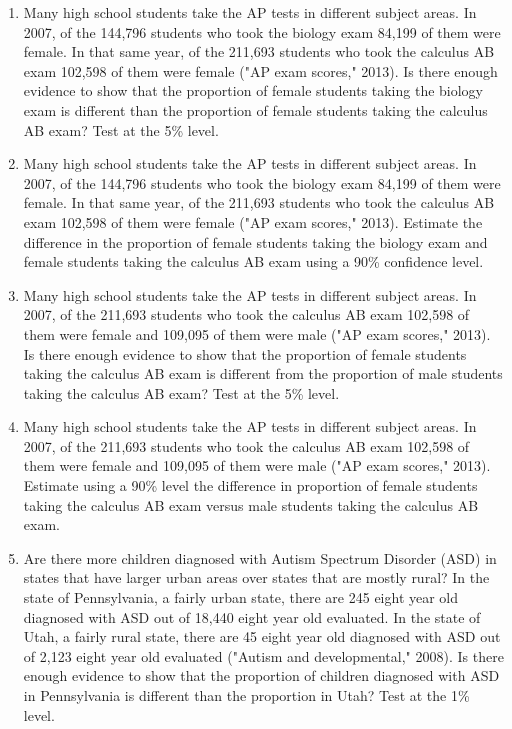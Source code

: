 \documentclass[
]{book}
\begin{document}
\begin{enumerate}
\def\labelenumi{\arabic{enumi}.}
\item
  Many high school students take the AP tests in different subject areas. In 2007, of the 144,796 students who took the biology exam 84,199 of them were female. In that same year, of the 211,693 students who took the calculus AB exam 102,598 of them were female ("AP exam scores," 2013). Is there enough evidence to show that the proportion of female students taking the biology exam is different than the proportion of female students taking the calculus AB exam? Test at the 5\% level.
\item
  Many high school students take the AP tests in different subject areas. In 2007, of the 144,796 students who took the biology exam 84,199 of them were female. In that same year, of the 211,693 students who took the calculus AB exam 102,598 of them were female ("AP exam scores," 2013). Estimate the difference in the proportion of female students taking the biology exam and female students taking the calculus AB exam using a 90\% confidence level.
\item
  Many high school students take the AP tests in different subject areas. In 2007, of the 211,693 students who took the calculus AB exam 102,598 of them were female and 109,095 of them were male ("AP exam scores," 2013). Is there enough evidence to show that the proportion of female students taking the calculus AB exam is different from the proportion of male students taking the calculus AB exam? Test at the 5\% level.
\item
  Many high school students take the AP tests in different subject areas. In 2007, of the 211,693 students who took the calculus AB exam 102,598 of them were female and 109,095 of them were male ("AP exam scores," 2013). Estimate using a 90\% level the difference in proportion of female students taking the calculus AB exam versus male students taking the calculus AB exam.
\item
  Are there more children diagnosed with Autism Spectrum Disorder (ASD) in states that have larger urban areas over states that are mostly rural? In the state of Pennsylvania, a fairly urban state, there are 245 eight year old diagnosed with ASD out of 18,440 eight year old evaluated. In the state of Utah, a fairly rural state, there are 45 eight year old diagnosed with ASD out of 2,123 eight year old evaluated ("Autism and developmental," 2008). Is there enough evidence to show that the proportion of children diagnosed with ASD in Pennsylvania is different than the proportion in Utah? Test at the 1\% level.

\end{enumerate}
\end{document}

